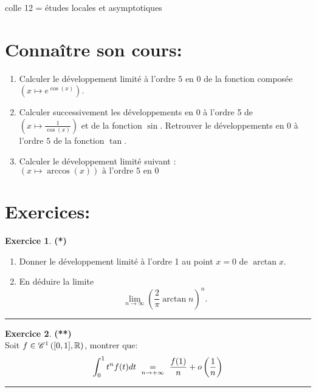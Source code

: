 \documentclass[a4paper,11pt]{article}
\theoremstyle{definition}
\newtheorem{exo}{Exercice} %
\begin{document}
	
	
	\begin{center}
		\Large \sc colle 12 = études locales et asymptotiques
	\end{center}
\raggedright

\section*{Connaître son cours:}
\begin{enumerate}
	\item Calculer le développement limité à l’ordre $5$ en $0$ de la fonction composée $\left(x \mapsto e^{\cos(x)}\right)$.
	\item Calculer successivement les développements en $0$ à l’ordre 5 de $\left( x \mapsto\frac{1}{\cos(x)}\right)$ et de la fonction $\sin$. Retrouver le développements en $0$ à l’ordre $5$ de la fonction $\tan$.
	\item Calculer le développement limité suivant : $\left(\displaystyle   x\mapsto \arccos (x)\right) \textrm{ à l'ordre 5 en 0}$
	
\end{enumerate}

\section*{Exercices:}%
	
\begin{exo}\textbf{(*)}\quad\\[0.25cm]%
	\begin{enumerate}
		\item Donner le développement limité à l'ordre 1 au point $x=0$ de
		$\arctan x$.
		\item En déduire la limite
		\[
		\lim_{n\to\infty} \left(\frac{2}{\pi}\arctan n\right)^n.
		\]
	\end{enumerate}
	
	\centering
	\rule{1\linewidth}{0.6pt}
\end{exo}

\begin{exo}\textbf{(**)}\quad\\[0.25cm]
	Soit $f \in  \mathscr{C}^1\left([0, 1], \mathbb{R}\right)$, montrer que:
	$$\int_{0}^{1}t^nf(t)dt  \ \underset{\small n\rightarrow+\infty}{=} \ \dfrac{f(1)}{n} + o\left(\dfrac{1}{n}\right)
	$$
	
	\centering
	\rule{1\linewidth}{0.6pt}
\end{exo}	
\end{document}
